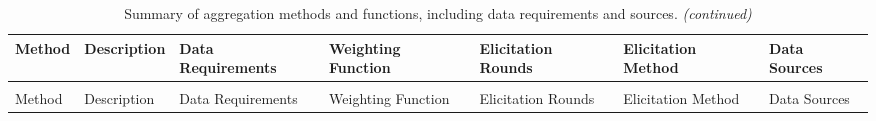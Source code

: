 \documentclass[article]{jss}
\begin{document}
\begingroup\fontsize{6}{8}\selectfont

\begin{longtable}[l]{>{\raggedright\arraybackslash}p{10em}>{\raggedright\arraybackslash}p{20em}>{\raggedright\arraybackslash}p{10em}>{\raggedright\arraybackslash}p{10em}>{\raggedright\arraybackslash}p{5em}>{\raggedright\arraybackslash}p{10em}>{\raggedright\arraybackslash}p{10em}}
\toprule
Method & Description & Data Requirements & Weighting Function & Elicitation Rounds & Elicitation Method & Data Sources\\
\midrule
\endfirsthead
\caption[]{\label{tbl-method-summary-table} Summary of aggregation methods and functions, including data requirements and sources. \textit{(continued)}}\\
\toprule
Method & Description & Data Requirements & Weighting Function & Elicitation Rounds & Elicitation Method & Data Sources\\
\midrule
\endhead


\end{longtable}
\end{document}
